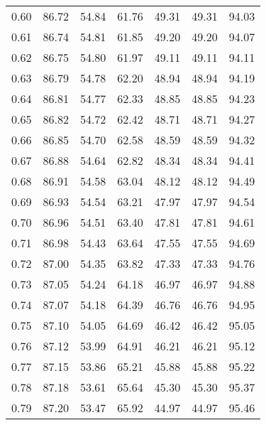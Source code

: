 \begin{tabular}{|c|c|c|c|c|c|c|}
      0.60 &     86.72 &     54.84 &      61.76 &   49.31 &      49.31 &         94.03 \\
      0.61 &     86.74 &     54.81 &      61.85 &   49.20 &      49.20 &         94.07 \\
      0.62 &     86.75 &     54.80 &      61.97 &   49.11 &      49.11 &         94.11 \\
      0.63 &     86.79 &     54.78 &      62.20 &   48.94 &      48.94 &         94.19 \\
      0.64 &     86.81 &     54.77 &      62.33 &   48.85 &      48.85 &         94.23 \\
      0.65 &     86.82 &     54.72 &      62.42 &   48.71 &      48.71 &         94.27 \\
      0.66 &     86.85 &     54.70 &      62.58 &   48.59 &      48.59 &         94.32 \\
      0.67 &     86.88 &     54.64 &      62.82 &   48.34 &      48.34 &         94.41 \\
      0.68 &     86.91 &     54.58 &      63.04 &   48.12 &      48.12 &         94.49 \\
      0.69 &     86.93 &     54.54 &      63.21 &   47.97 &      47.97 &         94.54 \\
      0.70 &     86.96 &     54.51 &      63.40 &   47.81 &      47.81 &         94.61 \\
      0.71 &     86.98 &     54.43 &      63.64 &   47.55 &      47.55 &         94.69 \\
      0.72 &     87.00 &     54.35 &      63.82 &   47.33 &      47.33 &         94.76 \\
      0.73 &     87.05 &     54.24 &      64.18 &   46.97 &      46.97 &         94.88 \\
      0.74 &     87.07 &     54.18 &      64.39 &   46.76 &      46.76 &         94.95 \\
      0.75 &     87.10 &     54.05 &      64.69 &   46.42 &      46.42 &         95.05 \\
      0.76 &     87.12 &     53.99 &      64.91 &   46.21 &      46.21 &         95.12 \\
      0.77 &     87.15 &     53.86 &      65.21 &   45.88 &      45.88 &         95.22 \\
      0.78 &     87.18 &     53.61 &      65.64 &   45.30 &      45.30 &         95.37 \\
      0.79 &     87.20 &     53.47 &      65.92 &   44.97 &      44.97 &         95.46 \\

\end{tabular}
